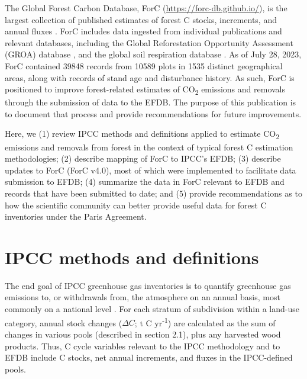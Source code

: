 \documentclass[, manuscript]{copernicus}
\begin{document}
The Global Forest Carbon Database, ForC
(\url{https://forc-db.github.io/}), is the largest collection of
published estimates of forest C stocks, increments, and annual fluxes
\citep{anderson-teixeira_forc_2018, anderson-teixeira_carbon_2021, anderson-teixeira_forcdb_2023}.
ForC includes data ingested from individual publications and relevant
databases, including the Global Reforestation Opportunity Assessment
(GROA) database \citep[database doi:
10.5281/zenodo.3983644]{cook-patton_mapping_2020}, and the global soil
respiration database
\citep[SRDB-V5,][]{bond-lamberty_global_2010, jian_restructured_2021}.
As of July 28, 2023, ForC contained 39848 records from 10589 plots in
1535 distinct geographical areas, along with records of stand age and
disturbance history. As such, ForC is positioned to improve
forest-related estimates of CO\textsubscript{2} emissions and removals
through the submission of data to the EFDB. The purpose of this
publication is to document that process and provide recommendations for
future improvements.

Here, we (1) review IPCC methods and definitions applied to estimate
CO\textsubscript{2} emissions and removals from forest in the context of
typical forest C estimation methodologies; (2) describe mapping of ForC
to IPCC's EFDB; (3) describe updates to ForC (ForC v4.0), most of which
were implemented to facilitate data submission to EFDB; (4) summarize
the data in ForC relevant to EFDB and records that have been submitted
to date; and (5) provide recommendations as to how the scientific
community can better provide useful data for forest C inventories under
the Paris Agreement.

\section{IPCC methods and definitions}

The end goal of IPCC greenhouse gas inventories is to quantify
greenhouse gas emissions to, or withdrawals from, the atmosphere on an
annual basis, most commonly on a national level
\citep{ipcc_2006_2006, ipcc_2019_2019}. For each stratum of subdivision
within a land-use category, annual stock changes (\(\Delta C\); t C
yr\textsuperscript{-1}) are calculated as the sum of changes in various
pools (described in section 2.1), plus any harvested wood products.
Thus, C cycle variables relevant to the IPCC methodology and to EFDB
include C stocks, net annual increments, and fluxes in the IPCC-defined
pools.
\end{document}
